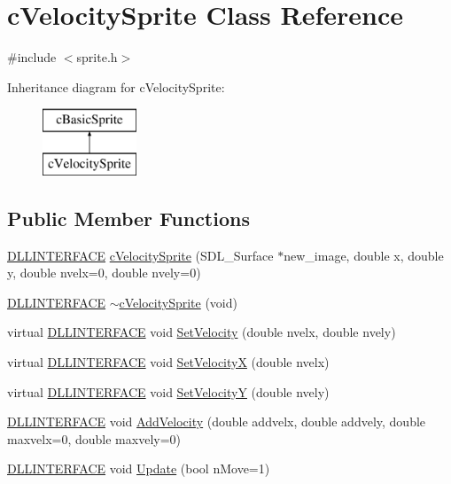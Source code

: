 \hypertarget{classc_velocity_sprite}{\section{c\-Velocity\-Sprite Class Reference}
\label{classc_velocity_sprite}
}


{\ttfamily \#include $<$sprite.\-h$>$}

Inheritance diagram for c\-Velocity\-Sprite\-:\begin{figure}[H]
\begin{center}
\leavevmode
\includegraphics[height=2.000000cm]{classc_velocity_sprite}
\end{center}
\end{figure}
\subsection*{Public Member Functions}
\begin{DoxyCompactItemize}
\item 
\hyperlink{_s_d_l__ep_8h_a38dd54df4631b4daf553096353d7b20b}{D\-L\-L\-I\-N\-T\-E\-R\-F\-A\-C\-E} \hyperlink{classc_velocity_sprite_a1901bf8ea344c51f40b788cae28dbcdd}{c\-Velocity\-Sprite} (S\-D\-L\-\_\-\-Surface $\ast$new\-\_\-image, double x, double y, double nvelx=0, double nvely=0)
\item 
\hyperlink{_s_d_l__ep_8h_a38dd54df4631b4daf553096353d7b20b}{D\-L\-L\-I\-N\-T\-E\-R\-F\-A\-C\-E} \hyperlink{classc_velocity_sprite_a67232bb630466595a26d4ce84bb32f0b}{$\sim$c\-Velocity\-Sprite} (void)
\item 
virtual \hyperlink{_s_d_l__ep_8h_a38dd54df4631b4daf553096353d7b20b}{D\-L\-L\-I\-N\-T\-E\-R\-F\-A\-C\-E} void \hyperlink{classc_velocity_sprite_acb4d562f26588d03e800a3aa9e597dff}{Set\-Velocity} (double nvelx, double nvely)
\item 
virtual \hyperlink{_s_d_l__ep_8h_a38dd54df4631b4daf553096353d7b20b}{D\-L\-L\-I\-N\-T\-E\-R\-F\-A\-C\-E} void \hyperlink{classc_velocity_sprite_a2a3c2332715a4a2ee59c5e8370be3697}{Set\-Velocity\-X} (double nvelx)
\item 
virtual \hyperlink{_s_d_l__ep_8h_a38dd54df4631b4daf553096353d7b20b}{D\-L\-L\-I\-N\-T\-E\-R\-F\-A\-C\-E} void \hyperlink{classc_velocity_sprite_aef3df19c5adebcf2be2523cd9a73d292}{Set\-Velocity\-Y} (double nvely)
\item 
\hyperlink{_s_d_l__ep_8h_a38dd54df4631b4daf553096353d7b20b}{D\-L\-L\-I\-N\-T\-E\-R\-F\-A\-C\-E} void \hyperlink{classc_velocity_sprite_ac35a2d125dd91d232da192c40e3ae13a}{Add\-Velocity} (double addvelx, double addvely, double maxvelx=0, double maxvely=0)
\item 
\hyperlink{_s_d_l__ep_8h_a38dd54df4631b4daf553096353d7b20b}{D\-L\-L\-I\-N\-T\-E\-R\-F\-A\-C\-E} void \hyperlink{classc_velocity_sprite_abe53c4d2cacfe4252a0aea6f8ec041af}{Update} (bool n\-Move=1)
\end{DoxyCompactItemize}
